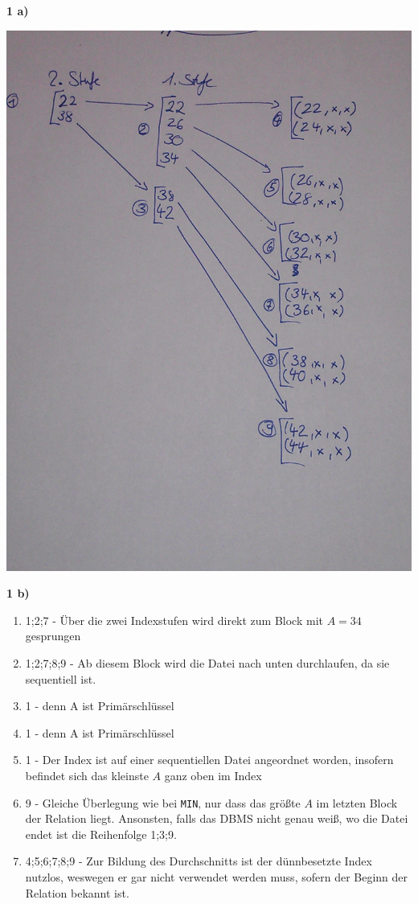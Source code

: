 \documentclass[12pt]{article}
\begin{document}
\textbf{1 a)}
\begin{center}
    \includegraphics[scale=0.1]{index.jpg}
\end{center}

\textbf{1 b)}
\begin{enumerate}
    \item 1;2;7 - Über die zwei Indexstufen wird direkt zum Block mit $A=34$ gesprungen
    \item 1;2;7;8;9 - Ab diesem Block wird die Datei nach unten durchlaufen, da sie
        sequentiell ist.
    \item 1 - denn A ist Primärschlüssel
    \item 1 - denn A ist Primärschlüssel
    \item 1 - Der Index ist auf einer sequentiellen Datei angeordnet worden,
        insofern befindet sich das kleinste $A$ ganz oben im Index
    \item 9 - Gleiche Überlegung wie bei \verb=MIN=, nur dass das größte $A$
        im letzten Block der Relation liegt. Ansonsten, falls das DBMS nicht
        genau weiß, wo die Datei endet ist die Reihenfolge 1;3;9.
    \item 4;5;6;7;8;9 - Zur Bildung des Durchschnitts ist der dünnbesetzte Index
        nutzlos, weswegen er gar nicht verwendet werden muss, sofern der Beginn
        der Relation bekannt ist.
\end{enumerate}
\end{document}
